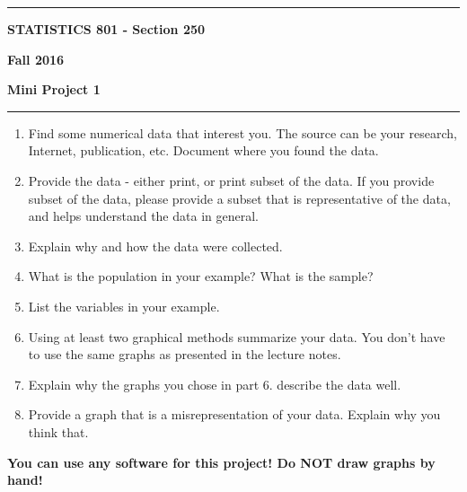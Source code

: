 \documentclass[12pt]{article}
\begin{document}
\hrule
\medskip
\centerline{\textbf{STATISTICS 801 - Section 250}}\hfill \textbf{Fall 2016}
\centerline{\textbf{Mini Project 1}}
\smallskip
\hrule
\begin{enumerate}
\item Find some numerical data that interest you. The source can be your research, Internet, publication, etc. Document where you found the data.
\item Provide the data - either print, or print subset of the data. If you provide subset of the data, please provide a subset that is representative of the data, and helps understand the data in general. 
\item Explain why and how the data were collected.
\item What is the population in your example? What is the sample?
\item List the variables in your example.
\item Using at least two graphical methods summarize your data. You don't have to use the same graphs as presented in the lecture notes.
\item Explain why the graphs you chose in part 6. describe the data well.
\item Provide a graph that is a misrepresentation of your data. Explain why you think that.
\end{enumerate}

\textbf{You can use any software for this project! Do NOT draw graphs by hand!}
\end{document}
